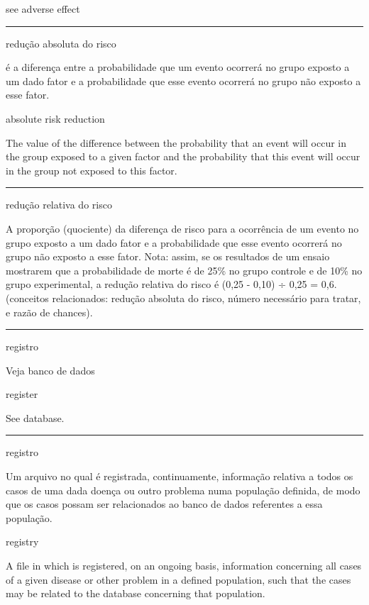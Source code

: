 \documentclass[
  openany]{book}
\begin{document}
see adverse effect

\begin{center}\rule{0.5\linewidth}{0.5pt}\end{center}

redução absoluta do risco

é a diferença entre a probabilidade que um evento ocorrerá no grupo exposto a um dado fator e a probabilidade que esse evento ocorrerá no grupo não exposto a esse fator.

absolute risk reduction

The value of the difference between the probability that an event will occur in the group exposed to a given factor and the probability that this event will occur in the group not exposed to this factor.

\begin{center}\rule{0.5\linewidth}{0.5pt}\end{center}

redução relativa do risco

A proporção (quociente) da diferença de risco para a ocorrência de um evento no grupo exposto a um dado fator e a probabilidade que esse evento ocorrerá no grupo não exposto a esse fator. Nota: assim, se os resultados de um ensaio mostrarem que a probabilidade de morte é de 25\% no grupo controle e de 10\% no grupo experimental, a redução relativa do risco é (0,25 - 0,10) ÷ 0,25 = 0,6. (conceitos relacionados: redução absoluta do risco, número necessário para tratar, e razão de chances).

\begin{center}\rule{0.5\linewidth}{0.5pt}\end{center}

registro

Veja banco de dados

register

See database.

\begin{center}\rule{0.5\linewidth}{0.5pt}\end{center}

registro

Um arquivo no qual é registrada, continuamente, informação relativa a todos os casos de uma dada doença ou outro problema numa população definida, de modo que os casos possam ser relacionados ao banco de dados referentes a essa população.

registry

A file in which is registered, on an ongoing basis, information concerning all cases of a given disease or other problem in a defined population, such that the cases may be related to the database concerning that population.
\end{document}
